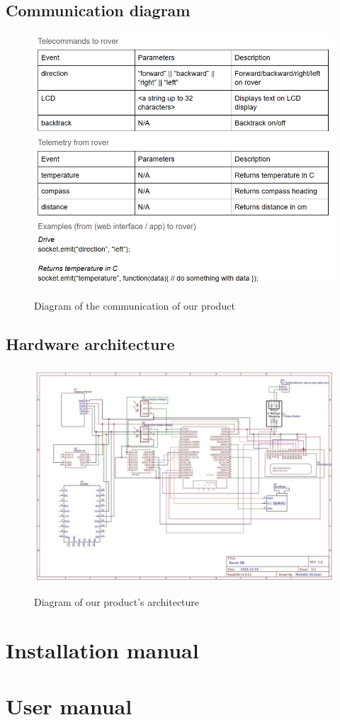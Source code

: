 \documentclass[12pt]{article}
\begin{document}
 	\subsection{Communication diagram}
 	\begin{figure}[H]
 		\centering
 		\includegraphics[width=\linewidth]{ComDiagram.png}\\
 		\caption{Diagram of the communication of our product}
 	\end{figure}
 	\subsection{Hardware architecture}
 	\begin{figure}[H]
 		\centering
 		\includegraphics[width=\linewidth]{HardwareArch.jpeg}\\
 		\caption{Diagram of our product's architecture}
 	\end{figure}
 	\section{Installation manual}
 	\section{User manual}
\end{document}
